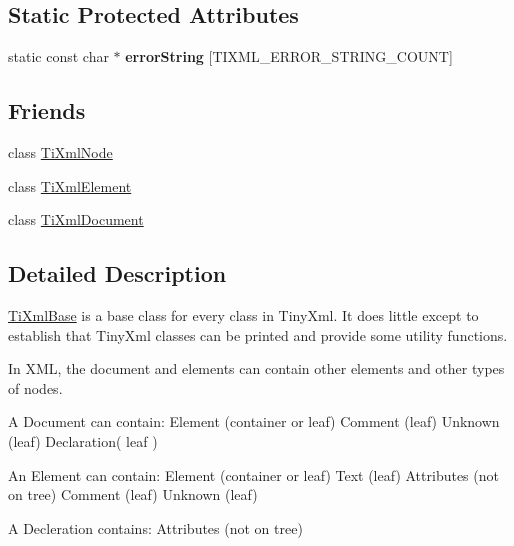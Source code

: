 \subsection*{Static Protected Attributes}
\begin{DoxyCompactItemize}
\item 
\hypertarget{class_ti_xml_base_aea4b8bd0d25d5de9174c1ed5ea106dff}{
static const char $\ast$ {\bfseries errorString} \mbox{[}TIXML\_\-ERROR\_\-STRING\_\-COUNT\mbox{]}}
\label{class_ti_xml_base_aea4b8bd0d25d5de9174c1ed5ea106dff}

\end{DoxyCompactItemize}
\subsection*{Friends}
\begin{DoxyCompactItemize}
\item 
\hypertarget{class_ti_xml_base_a218872a0d985ae30e78c55adc4bdb196}{
class \hyperlink{class_ti_xml_base_a218872a0d985ae30e78c55adc4bdb196}{TiXmlNode}}
\label{class_ti_xml_base_a218872a0d985ae30e78c55adc4bdb196}

\item 
\hypertarget{class_ti_xml_base_ab6592e32cb9132be517cc12a70564c4b}{
class \hyperlink{class_ti_xml_base_ab6592e32cb9132be517cc12a70564c4b}{TiXmlElement}}
\label{class_ti_xml_base_ab6592e32cb9132be517cc12a70564c4b}

\item 
\hypertarget{class_ti_xml_base_a173617f6dfe902cf484ce5552b950475}{
class \hyperlink{class_ti_xml_base_a173617f6dfe902cf484ce5552b950475}{TiXmlDocument}}
\label{class_ti_xml_base_a173617f6dfe902cf484ce5552b950475}

\end{DoxyCompactItemize}


\subsection{Detailed Description}
\hyperlink{class_ti_xml_base}{TiXmlBase} is a base class for every class in TinyXml. It does little except to establish that TinyXml classes can be printed and provide some utility functions.

In XML, the document and elements can contain other elements and other types of nodes.

\begin{DoxyVerb}
	A Document can contain:	Element	(container or leaf)
							Comment (leaf)
							Unknown (leaf)
							Declaration( leaf )

	An Element can contain:	Element (container or leaf)
							Text	(leaf)
							Attributes (not on tree)
							Comment (leaf)
							Unknown (leaf)

	A Decleration contains: Attributes (not on tree)
	\end{DoxyVerb}
 

